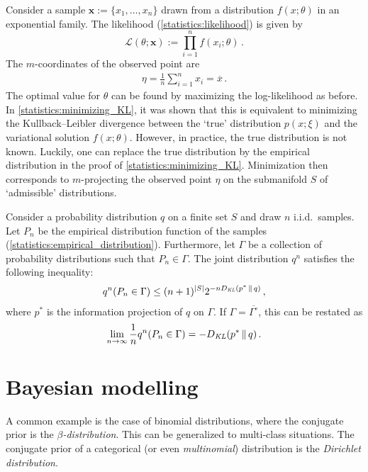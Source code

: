     Consider a sample $\mathbf{x}:=\{x_1,\ldots,x_n\}$ drawn from a distribution $f(x;\theta)$ in an exponential family. The likelihood (\cref{statistics:likelihood}) is given by \[\mathcal{L}(\theta;\mathbf{x}) := \prod_{i=1}^nf(x_i;\theta)\,.\] The $m$-coordinates of the observed point are
    \begin{gather}
        \eta = \frac{1}{n}\sum_{i=1}^nx_i = \overline{x}\,.
    \end{gather}
    The optimal value for $\theta$ can be found by maximizing the log-likelihood as before. In \cref{statistics:minimizing_KL}, it was shown that this is equivalent to minimizing the Kullback--Leibler divergence between the `true' distribution $p(x;\xi)$ and the variational solution $f(x;\theta)$. However, in practice, the true distribution is not known. Luckily, one can replace the true distribution by the empirical distribution in the proof of \cref{statistics:minimizing_KL}. Minimization then corresponds to $m$-projecting the observed point $\eta$ on the submanifold $S$ of `admissible' distributions.

    \begin{theorem}[Sanov]
        Consider a probability distribution $q$ on a finite set $S$ and draw $n$ i.i.d.~samples. Let $P_n$ be the empirical distribution function of the samples (\cref{statistics:empirical_distribution}). Furthermore, let $\Gamma$ be a collection of probability distributions such that $P_n\in\Gamma$. The joint distribution $q^n$ satisfies the following inequality:
        \begin{gather}
            q^n(P_n\in\Gamma) \leq (n+1)^{|S|}2^{-n D_{\emph{KL}}(p^*\,\|\,q)}\,,
        \end{gather}
        where $p^*$ is the information projection of $q$ on $\Gamma$. If $\Gamma=\overline{\Gamma^\circ}$, this can be restated as
        \begin{gather}
            \lim_{n\rightarrow\infty}\frac{1}{n}q^n(P_n\in\Gamma) = - D_{\emph{KL}}(p^*\,\|\,q)\,.
        \end{gather}
    \end{theorem}

\section{Bayesian modelling}

    \begin{example}
        A common example is the case of binomial distributions, where the conjugate prior is the \textit{$\beta$-distribution}. This can be generalized to multi-class situations. The conjugate prior of a categorical (or even \textit{multinomial}) distribution is the \textit{Dirichlet distribution}.
    \end{example}

